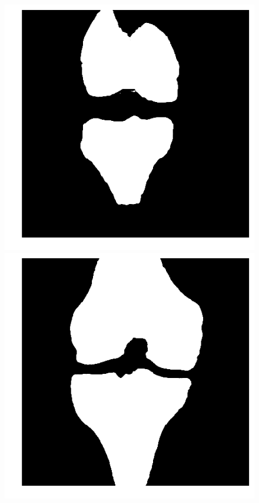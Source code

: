 \begin{figure}[H]
\endminipage
\vspace{0.15cm}
  \includegraphics[width=\linewidth]{imgs/transfer_size_y1.png}
\endminipage\hfill
{}
  \includegraphics[width=\linewidth]{imgs/transfer_size_y2.png}

\end{figure}
